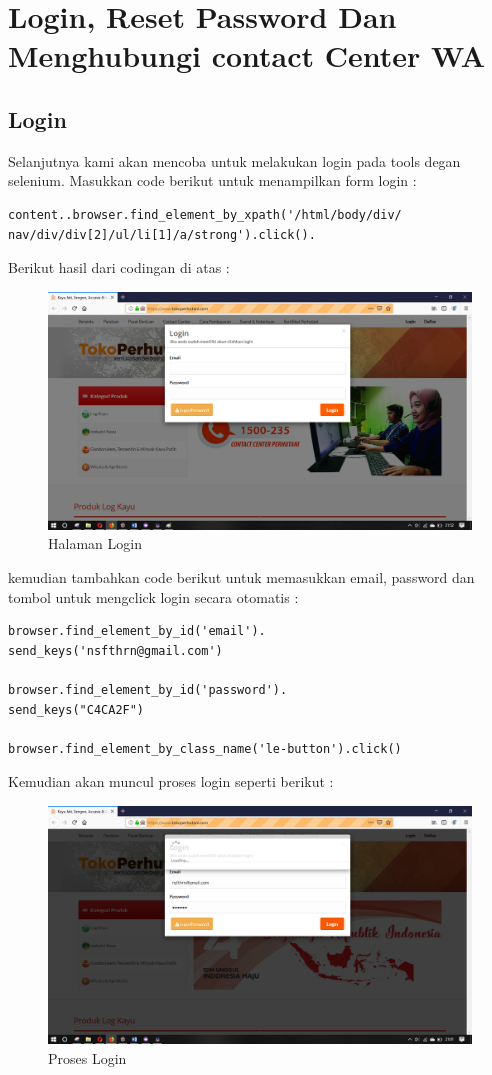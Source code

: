 \newpage
\section{Login, Reset Password Dan Menghubungi contact Center WA}
\subsection{Login}
Selanjutnya kami akan mencoba untuk melakukan login pada tools degan selenium. 
Masukkan code berikut untuk menampilkan form login :
\begin{verbatim}
content..browser.find_element_by_xpath('/html/body/div/
nav/div/div[2]/ul/li[1]/a/strong').click().
\end{verbatim}



Berikut hasil dari codingan di atas :
\begin{figure}[h]
	\centering
	\includegraphics[scale=0.20]{figures/0login}
	\caption{Halaman Login}
\end{figure}

kemudian tambahkan code berikut untuk memasukkan email, password dan tombol untuk mengclick login secara otomatis : 
\begin{verbatim}
browser.find_element_by_id('email').
send_keys('nsfthrn@gmail.com')

browser.find_element_by_id('password').
send_keys("C4CA2F")

browser.find_element_by_class_name('le-button').click() 
\end{verbatim}
\newpage
Kemudian akan muncul proses login seperti berikut :
\begin{figure}[h]
	\centering
	\includegraphics[scale=0.21]{figures/1login}
	\caption{Proses Login}
\end{figure}

